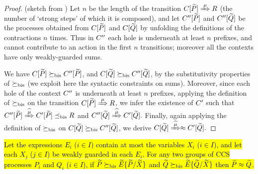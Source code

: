 \begin{proof}{(sketch from \cite{sangiorgi2017equations})}
Let $n$ be the length of the transition $\ct{\til P}\Arr\mu R$  (the
number of `strong steps' of which it is composed), and  
let $C'' [\widetilde P]$ and $C'' [\widetilde Q]$  be the processes obtained
from  $C [\widetilde P]$ and $C [\widetilde Q]$ by unfolding the definitions
of the contractions $n$ times. Thus in $C''$ each hole is
underneath at least $n$ prefixes, and cannot contribute to an action
in the first $n$ transitions; moreover all the contexts have only
weakly-guarded sums.

We have $C [\widetilde P] \mathrel{\succeq_{\rm{bis}}} C'' [\widetilde P]$, and 
$C [\widetilde Q] \mathrel{\succeq_{\rm{bis}}} C'' [\widetilde Q]$, 
 by the substitutivity  properties of $\mathrel{\succeq_{\rm{bis}}}$ (we exploit here
 the syntactic constraints on sums). Moreover,
 since each hole of the  context $C''$ is underneath at least $n$
 prefixes, applying  
the definition
 of $ \mathrel{\succeq_{\rm{bis}}}$ on the transition 
 $\ct{\til P}\Arr{\mu}  R$, we infer the existence
 of $C'$ such that 
$
\ctpp{\til P}\Arcap{\mu} \ctp{\til P} \mexpaBIS R
$
and 
$
\ctpp{\til Q}\Arcap{\mu}  \ctp{\til Q} 
. $
Finally, again applying the definition of $\mathrel{\succeq_{\rm{bis}}}$ on 
$C [\widetilde Q] \mathrel{\succeq_{\rm{bis}}} C'' [\widetilde Q]$, 
we derive 
$
\ct{\til Q}\Arcap{\mu}  \wb \ctp{\til Q} 
.$
\end{proof}

\begin{theorem} %
\label{t:contraBisimulationU} %
\hl{Let the expressions $E_i$ ($i \in I$) contain at most the
  variables $X_i$ ($i \in I$), and let each $X_j$ ($j\in I$) be weakly
  guarded in each $E_i$. For any two groups of CCS processes $P_i$ and
  $Q_i$ ($i \in I$), if $\widetilde P \mathrel{\succeq_{\rm{bis}}} \widetilde E\{\widetilde P/\widetilde X\}$ and
    $\widetilde Q \mathrel{\succeq_{\rm{bis}}} \widetilde E\{\widetilde Q/\widetilde X\}$ then $\widetilde P \approx \widetilde Q$.}
\end{theorem}

